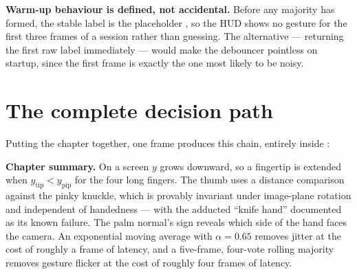 \begin{keyidea}
\textbf{Warm-up behaviour is defined, not accidental.} Before any majority has formed, the stable
label is the placeholder \code{---}, so the HUD shows no gesture for the first three frames of a
session rather than guessing. The alternative --- returning the first raw label immediately --- would
make the debouncer pointless on startup, since the first frame is exactly the one most likely to be
noisy.
\end{keyidea}

\section{The complete decision path}

Putting the chapter together, one frame produces this chain, entirely inside :

\begin{center}
\end{center}

\begin{keyidea}
\textbf{Chapter summary.} On a screen $y$ grows downward, so a fingertip is extended when
$y_{\text{tip}} < y_{\text{pip}}$ for the four long fingers. The thumb uses a distance comparison
against the pinky knuckle, which is provably invariant under image-plane rotation and independent of
handedness --- with the adducted ``knife hand'' documented as its known failure. The palm normal's
sign reveals which side of the hand faces the camera. An exponential moving average with
$\alpha = 0.65$ removes jitter at the cost of roughly a frame of latency, and a five-frame,
four-vote rolling majority removes gesture flicker at the cost of roughly four frames of latency.
\end{keyidea}
